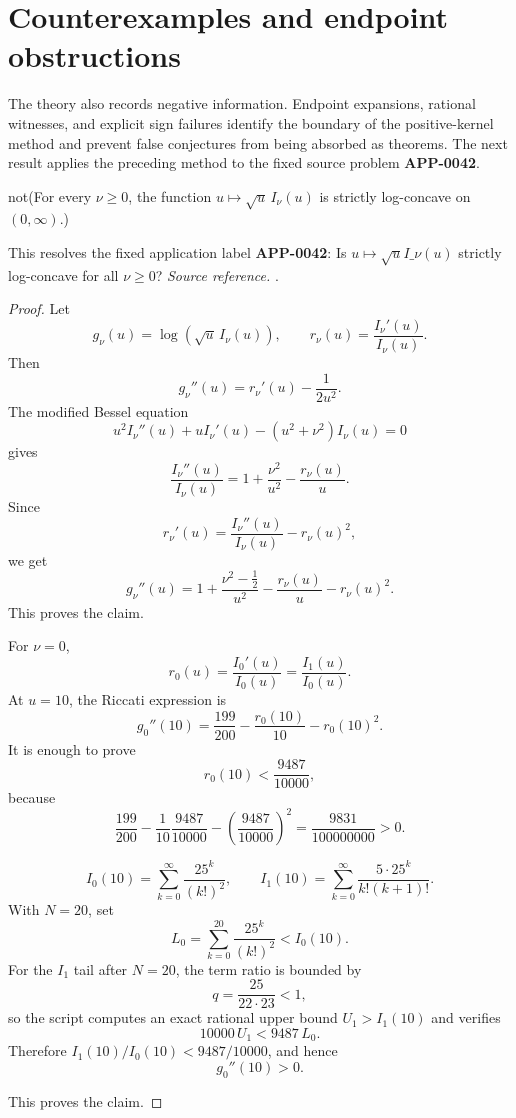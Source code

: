 \section{Counterexamples and endpoint obstructions}
The theory also records negative information.  Endpoint expansions, rational witnesses, and explicit sign failures identify the boundary of the positive-kernel method and prevent false conjectures from being absorbed as theorems.
The next result applies the preceding method to the fixed source problem \textbf{APP-0042}.
\begin{counterexample}
\label{res:not-bessel-i-sqrt-log-concavity-nu-ge-0}
not(For every \(\nu\ge0\), the function \(u\mapsto \sqrt{u}\,I_\nu(u)\) is strictly log-concave on \((0,\infty)\).)

This resolves the fixed application label \textbf{APP-0042}: Is \(u\mapsto \sqrt{u}I\_\nu(u)\) strictly log-concave for all \(\nu\ge0\)?
\emph{Source reference.} \cite{app-app-0042-source}.
\end{counterexample}
\begin{proof}
Let
\[
g_\nu(u)=\log(\sqrt u\,I_\nu(u)),
\qquad
r_\nu(u)=\frac{I_\nu'(u)}{I_\nu(u)}.
\]
Then
\[
g_\nu''(u)=r_\nu'(u)-\frac{1}{2u^2}.
\]
The modified Bessel equation
\[
u^2I_\nu''(u)+uI_\nu'(u)-(u^2+\nu^2)I_\nu(u)=0
\]
gives
\[
\frac{I_\nu''(u)}{I_\nu(u)}
=1+\frac{\nu^2}{u^2}-\frac{r_\nu(u)}{u}.
\]
Since
\[
r_\nu'(u)=\frac{I_\nu''(u)}{I_\nu(u)}-r_\nu(u)^2,
\]
we get
\[
g_\nu''(u)
=
1+\frac{\nu^2-\frac12}{u^2}
-\frac{r_\nu(u)}{u}
-r_\nu(u)^2.
\]
This proves the claim.

For \(\nu=0\),
\[
r_0(u)=\frac{I_0'(u)}{I_0(u)}=\frac{I_1(u)}{I_0(u)}.
\]
At \(u=10\), the Riccati expression is
\[
g_0''(10)=\frac{199}{200}-\frac{r_0(10)}{10}-r_0(10)^2.
\]
It is enough to prove
\[
r_0(10)<\frac{9487}{10000},
\]
because
\[
\frac{199}{200}
-\frac{1}{10}\frac{9487}{10000}
-\left(\frac{9487}{10000}\right)^2
=\frac{9831}{100000000}>0.
\]

\[
I_0(10)=\sum_{k=0}^{\infty}\frac{25^k}{(k!)^2},
\qquad
I_1(10)=\sum_{k=0}^{\infty}\frac{5\cdot25^k}{k!(k+1)!}.
\]
With \(N=20\), set
\[
L_0=\sum_{k=0}^{20}\frac{25^k}{(k!)^2}<I_0(10).
\]
For the \(I_1\) tail after \(N=20\), the term ratio is bounded by
\[
q=\frac{25}{22\cdot23}<1,
\]
so the script computes an exact rational upper bound \(U_1>I_1(10)\) and verifies
\[
10000\,U_1<9487\,L_0.
\]
Therefore \(I_1(10)/I_0(10)<9487/10000\), and hence
\[
g_0''(10)>0.
\]

This proves the claim.
\end{proof}

